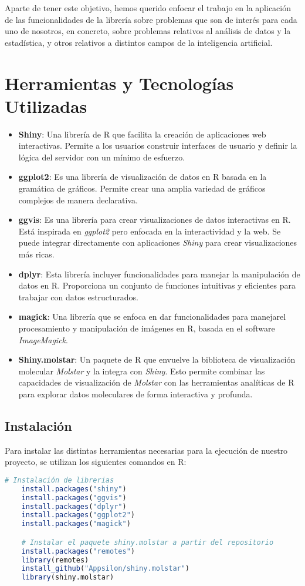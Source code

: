 \documentclass[10pt,a4paper]{article}
\begin{document}
\noindent Aparte de tener este objetivo, hemos querido enfocar el trabajo en la aplicación de las funcionalidades de la librería sobre problemas que son de interés para cada uno de nosotros, en concreto, sobre problemas relativos al análisis de datos y la estadística, y otros relativos a distintos campos de la inteligencia artificial.\newline

\section{Herramientas y Tecnologías Utilizadas}
\begin{itemize}
    \item \textbf{Shiny}: Una librería de R que facilita la creación de aplicaciones web interactivas. Permite a los usuarios construir interfaces de usuario y definir la lógica del servidor con un mínimo de esfuerzo.
    \item \textbf{ggplot2}: Es una librería de visualización de datos en R basada en la gramática de gráficos. Permite crear una amplia variedad de gráficos complejos de manera declarativa.
    \item \textbf{ggvis}: Es una librería para crear visualizaciones de datos interactivas en R. Está inspirada en \textit{ggplot2} pero enfocada en la interactividad y la web. Se puede integrar directamente con aplicaciones \textit{Shiny} para crear visualizaciones más ricas.
    \item \textbf{dplyr}: Esta librería incluyer funcionalidades para manejar la manipulación de datos en R. Proporciona un conjunto de funciones intuitivas y eficientes para trabajar con datos estructurados.    
    \item \textbf{magick}: Una librería que se enfoca en dar funcionalidades para manejarel procesamiento y manipulación de imágenes en R, basada en el software \textit{ImageMagick}.
    \item \textbf{Shiny.molstar}: Un paquete de R que envuelve la biblioteca de visualización molecular \textit{Molstar} y la integra con \textit{Shiny}. Esto permite combinar las capacidades de visualización de \textit{Molstar} con las herramientas analíticas de R para explorar datos moleculares de forma interactiva y profunda.
\end{itemize}

\subsection{Instalación}
\noindent Para instalar las distintas herramientas necesarias para la ejecución de nuestro proyecto, se utilizan los siguientes comandos en R:
\begin{lstlisting}[language=R, caption={Instalación de librerías}]
    # Instalación de librerias
    install.packages("shiny")
    install.packages("ggvis")
    install.packages("dplyr")
    install.packages("ggplot2")
    install.packages("magick")

    # Instalar el paquete shiny.molstar a partir del repositorio
    install.packages("remotes")
    library(remotes)
    install_github("Appsilon/shiny.molstar")
    library(shiny.molstar)
\end{lstlisting}
\end{document}
